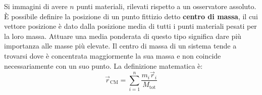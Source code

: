 \documentclass[10pt,a4paper]{book}
\begin{document}
Si immagini di avere $n$ punti materiali, rilevati rispetto a un osservatore assoluto. È possibile definire la posizione di un punto fittizio detto \textbf{centro di massa}, il cui vettore posizione è dato dalla posizione media di tutti i punti materiali pesati per la loro massa. Attuare una media ponderata di questo tipo significa dare più importanza alle masse più elevate. Il centro di massa di un sistema tende a trovarsi dove è concentrata maggiormente la sua massa e non coincide necessariamente con un suo punto. La definizione matematica è:
\[
	\boxed{\vec{r}_\text{CM} =\sum_{i=1}^n \frac{m_i\vec{r}_i}{M_\text{tot}}}
\]
\begin{figure}[htpb]
	\centering
	


	\begin{tikzpicture}[x=0.75pt,y=0.75pt,yscale=-1,xscale=1]


\end{tikzpicture}
\end{figure}
\end{document}
